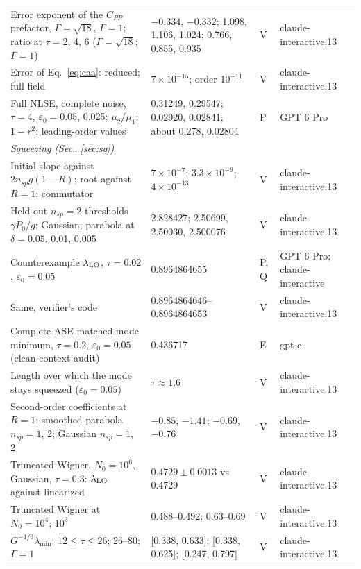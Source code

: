 \documentclass[aps,pra,twocolumn,superscriptaddress,nofootinbib,floatfix]{revtex4-2}
\newcommand{\nsp}{n_{sp}}
\newcommand{\eps}{\varepsilon_0}
\newcommand{\lamLO}{\lambda_{\rm LO}}
\begin{document}
\begin{table}[t]
\begin{ruledtabular}
\begin{tabular}{p{9.0cm}p{4.6cm}p{0.7cm}p{2.7cm}}
\raggedright Error exponent of the $C_{PP}$ prefactor, $\Gamma=\sqrt{18}$, $\Gamma=1$; ratio at $\tau=2$, 4, 6 ($\Gamma=\sqrt{18}$; $\Gamma=1$) & \raggedright $-0.334$, $-0.332$; 1.098, 1.106, 1.024; 0.766, 0.855, 0.935 & \raggedright V & \raggedright claude-interactive.13 \tabularnewline
\raggedright Error of Eq.~\eqref{eq:caa}: reduced; full field & \raggedright $7\times10^{-15}$; order $10^{-11}$ & \raggedright V & \raggedright claude-interactive.13 \tabularnewline
\raggedright Full NLSE, complete noise, $\tau=4$, $\eps=0.05$, 0.025: $\mu_2/\mu_1$; $1-r^2$; leading-order values & \raggedright 0.31249, 0.29547; 0.02920, 0.02841; about 0.278, 0.02804 & \raggedright P & \raggedright GPT 6 Pro \tabularnewline
\multicolumn{4}{l}{\textit{Squeezing (Sec.~\ref{sec:sq})}} \tabularnewline
\raggedright Initial slope against $2\nsp g(1-R)$; root against $R=1$; commutator & \raggedright $7\times10^{-7}$; $3.3\times10^{-9}$; $4\times10^{-13}$ & \raggedright V & \raggedright claude-interactive.13 \tabularnewline
\raggedright Held-out $\nsp=2$ thresholds $\gamma P_0/g$: Gaussian; parabola at $\delta=0.05$, 0.01, 0.005 & \raggedright 2.828427; 2.50699, 2.50030, 2.500076 & \raggedright V & \raggedright claude-interactive.13 \tabularnewline
\raggedright Counterexample $\lamLO$, $\tau=0.02$, $\eps=0.05$ & \raggedright 0.8964864655 & \raggedright P, Q & \raggedright GPT 6 Pro; claude-interactive \tabularnewline
\raggedright Same, verifier's code & \raggedright 0.8964864646--0.8964864653 & \raggedright V & \raggedright claude-interactive.13 \tabularnewline
\raggedright Complete-ASE matched-mode minimum, $\tau=0.2$, $\eps=0.05$ (clean-context audit) & \raggedright 0.436717 & \raggedright E & \raggedright gpt-e \tabularnewline
\raggedright Length over which the mode stays squeezed ($\eps=0.05$) & \raggedright $\tau\approx1.6$ & \raggedright V & \raggedright claude-interactive.13 \tabularnewline
\raggedright Second-order coefficients at $R=1$: smoothed parabola $\nsp=1$, 2; Gaussian $\nsp=1$, 2 & \raggedright $-0.85$, $-1.41$; $-0.69$, $-0.76$ & \raggedright V & \raggedright claude-interactive.13 \tabularnewline
\raggedright Truncated Wigner, $N_0=10^6$, Gaussian, $\tau=0.3$: $\lamLO$ against linearized & \raggedright $0.4729\pm0.0013$ vs 0.4729 & \raggedright V & \raggedright claude-interactive.13 \tabularnewline
\raggedright Truncated Wigner at $N_0=10^4$; $10^3$ & \raggedright 0.488--0.492; 0.63--0.69 & \raggedright V & \raggedright claude-interactive.13 \tabularnewline
\raggedright $G^{-1/3}\lambda_{\min}$: $12\le\tau\le26$; 26--80; $\Gamma=1$ & \raggedright [0.338, 0.633]; [0.338, 0.625]; [0.247, 0.797] & \raggedright V & \raggedright claude-interactive.13 \tabularnewline

\end{tabular}
\end{ruledtabular}
\end{table}
\end{document}
